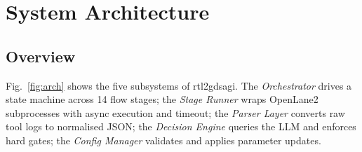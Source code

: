 \documentclass[conference]{IEEEtran}
\begin{document}
\section{System Architecture}

\subsection{Overview}

Fig.~\ref{fig:arch} shows the five subsystems of rtl2gdsagi.
The \emph{Orchestrator} drives a state machine across 14 flow stages;
the \emph{Stage Runner} wraps OpenLane2 subprocesses with async
execution and timeout; the \emph{Parser Layer} converts raw tool logs
to normalised JSON; the \emph{Decision Engine} queries the LLM and
enforces hard gates; the \emph{Config Manager} validates and applies
parameter updates.
\end{document}
